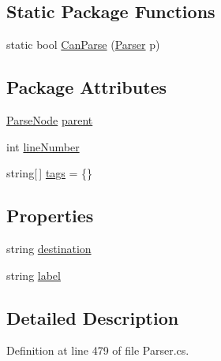 \subsection*{Static Package Functions}
\begin{DoxyCompactItemize}
\item 
static bool \hyperlink{a00136_a1ffeca22df52451120cb362f90fd4e9f}{Can\-Parse} (\hyperlink{a00139}{Parser} p)
\end{DoxyCompactItemize}
\subsection*{Package Attributes}
\begin{DoxyCompactItemize}
\item 
\hyperlink{a00138}{Parse\-Node} \hyperlink{a00138_af313a82103fcc2ff5a177dbb06b92f7b}{parent}
\item 
int \hyperlink{a00138_a18b493382de0fde5b4299c1bd2250075}{line\-Number}
\item 
string\mbox{[}$\,$\mbox{]} \hyperlink{a00138_a58b3a15788fd2d4127d73619dc6d04ae}{tags} = \{\}
\end{DoxyCompactItemize}
\subsection*{Properties}
\begin{DoxyCompactItemize}
\item 
string \hyperlink{a00136_abbe56fba06169901508e6c659f06c236}{destination}
\item 
string \hyperlink{a00136_a7f27d78e67fed6992767e995e70fc468}{label}
\end{DoxyCompactItemize}


\subsection{Detailed Description}


Definition at line 479 of file Parser.\-cs.



